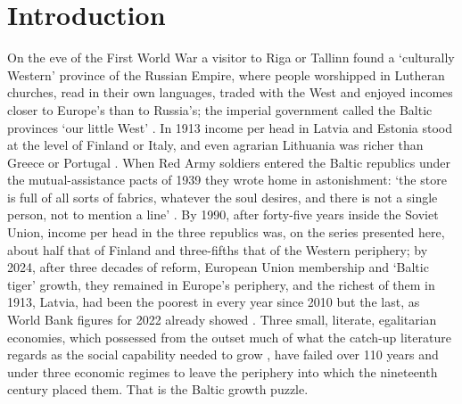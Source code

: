 \section*{Introduction}

On the eve of the First World War a visitor to Riga or Tallinn found a `culturally Western' province of the Russian Empire, where people worshipped in Lutheran churches, read in their own languages, traded with the West and enjoyed incomes closer to Europe's than to Russia's; the imperial government called the Baltic provinces `our little West' \parencites[129]{Corumbalticrussia}[427]{kodres_soviet_west}. In 1913 income per head in Latvia and Estonia stood at the level of Finland or Italy, and even agrarian Lithuania was richer than Greece or Portugal \parencite[129--30]{norkus_2023_output}. When Red Army soldiers entered the Baltic republics under the mutual-assistance pacts of 1939 they wrote home in astonishment: `the store is full of all sorts of fabrics, whatever the soul desires, and there is not a single person, not to mention a line' \parencite[279]{meltyukhov2014en}. By 1990, after forty-five years inside the Soviet Union, income per head in the three republics was, on the series presented here, about half that of Finland and three-fifths that of the Western periphery; by 2024, after three decades of reform, European Union membership and `Baltic tiger' growth, they remained in Europe's periphery, and the richest of them in 1913, Latvia, had been the poorest in every year since 2010 but the last, as World Bank figures for 2022 already showed \parencite[93]{koll_2025_reinterpretation}. Three small, literate, egalitarian economies, which possessed from the outset much of what the catch-up literature regards as the social capability needed to grow \parencite[388]{abramovitz1986}, have failed over 110 years and under three economic regimes to leave the periphery into which the nineteenth century placed them. That is the Baltic growth puzzle.

